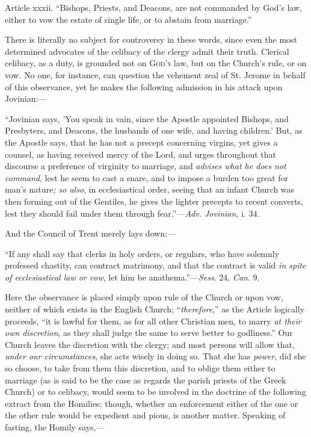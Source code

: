 
Article xxxii. ``Bishops, Priests, and Deacons, are not
commanded by God's law, either to vow the estate of single life, or to
abstain from marriage.''

There is literally no subject for controversy in these words, since
even the most determined advocates of the celibacy of the clergy admit
their truth. Clerical celibacy, as a duty, is grounded not on G\textsc{od's}
law, but on the Church's rule, or on vow. No one, for instance, can
question the vehement zeal of St. Jerome in behalf of this observance,
yet he makes the following admission in his attack upon Jovinian:—

``Jovinian says, 'You speak in vain, since the
Apostle appointed Bishops, and Presbyters, and Deacons, the husbands
of one wife, and having children.' But, as the Apostle says, that he
has not a precept concerning virgins, yet gives a counsel, as having
received mercy of the Lord, and urges throughout that discourse a
preference of virginity to marriage, and \emph{advises what he does not
command}, lest he seem to cast a snare, and to impose a burden too
great for man's nature\emph{; so also}, in ecclesiastical order,
seeing that an infant Church was then forming out of the Gentiles, he
gives the lighter precepts to recent converts, lest they should fail
under them through fear.''—\emph{Adv. Jovinian}, i. 34.

And the Council of Trent merely lays down:—

``If any shall say that clerks in holy orders,
or regulars, who have solemnly professed chastity, can contract
matrimony, and that the contract is valid \emph{in spite of
ecclesiastical law or vow}, let him be anathema.''—\emph{Sess}.
24, \emph{Can}. 9.

Here the observance is placed simply upon rule of the Church or
upon vow, neither of which exists in the English Church; ``\emph{therefore},''
as the Article logically proceeds, ``it is lawful for them, as for
all other Christian men, to marry \emph{at their own discretion}, as
they shall judge the same to serve better to godliness.''
Our Church leaves the discretion with the clergy; and most persons
will allow that, \emph{under our circumstances}, she acts wisely in
doing so. That she has \emph{power}, did she so choose, to take from
them this discretion, and to oblige them either to marriage (as is
said to be the case as regards the parish priests of the Greek Church)
or to celibacy, would seem to be involved in the doctrine of the
following extract from the Homilies; though, whether an enforcement
either of the one or the other rule would be expedient and pious, is
another matter. Speaking of fasting, the Homily says,—

